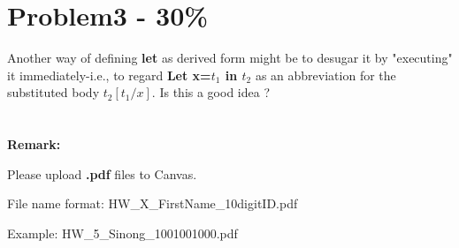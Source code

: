 \documentclass{article}
\begin{document}
\section*{Problem3 - 30\%}

Another way of defining \textbf{let} as derived form might be to desugar it by "executing" it immediately-i.e., to regard \textbf{Let x=$t_1$ in $t_2$} as an abbreviation for the substituted body \textbf{$t_2[t_1/x]$}. Is this a good idea ?

\section*{}

\textbf{Remark:} 

Please upload \textbf{.pdf} files to Canvas.

File name format: {\color{red} HW\_X\_FirstName\_10digitID.pdf}

Example: {HW\_5\_Sinong\_1001001000.pdf}
\end{document}
